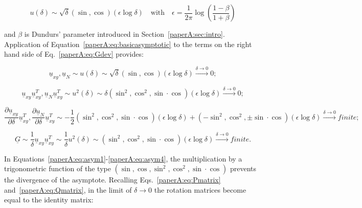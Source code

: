 \begin{equation}\label{paperA:eq:basicasymptotic}
u\left(\delta\right)\sim \sqrt{\delta}\left(\sin,\cos\right)\left(\epsilon\log{\delta}\right)\quad\text{with}\quad\epsilon=\frac{1}{2\pi}\log{\left(\frac{1-\beta}{1+\beta}\right)}
\end{equation}

and $\beta$ is Dundurs' parameter introduced in Section~\ref{paperA:sec:intro}. Application of Equation~\ref{paperA:eq:basicasymptotic} to the terms on the right hand side of Eq.~\ref{paperA:eq:Gdev} provides:

\begin{equation}\label{paperA:eq:asym1}
\underline{u}_{xy},\underline{u}_{N}\sim u\left(\delta\right)\sim\sqrt{\delta}\left(\sin,\cos\right)\left(\epsilon\log{\delta}\right)\xrightarrow{\delta\rightarrow 0}0;
\end{equation}

\begin{equation}\label{paperA:eq:asym2}
\underline{u}_{xy}\underline{u}_{xy}^{T},\underline{u}_{N}\underline{u}_{xy}^{T}\sim u^{2}\left(\delta\right)\sim\delta\left(\sin^{2},\cos^{2},\sin\cdot\cos\right)\left(\epsilon\log{\delta}\right)\xrightarrow{\delta\rightarrow 0}0;
\end{equation}

\begin{equation}\label{paperA:eq:asym3}
\frac{\partial \underline{u}_{xy}}{\partial \delta}\underline{u}_{xy}^{T},\frac{\partial \underline{u}_{N}}{\partial \delta}\underline{u}_{xy}^{T}\sim -\frac{1}{2}\left(\sin^{2},\cos^{2},\sin\cdot\cos\right)\left(\epsilon\log{\delta}\right)+\left(-\sin^{2},\cos^{2},\pm\sin\cdot\cos\right)\left(\epsilon\log{\delta}\right)\xrightarrow{\delta\rightarrow 0}finite;
\end{equation}

\begin{equation}\label{paperA:eq:asym4}
\underline{G}\sim\frac{1}{\delta}\underline{u}_{xy}\underline{u}_{xy}^{T}\sim \frac{1}{\delta}u^{2}\left(\delta\right)\sim\left(\sin^{2},\cos^{2},\sin\cdot\cos\right)\left(\epsilon\log{\delta}\right)\xrightarrow{\delta\rightarrow 0}finite.
\end{equation}

In Equations~\ref{paperA:eq:asym1}-\ref{paperA:eq:asym4}, the multiplication by a trigonometric function of the type $\left(\sin,\cos,\sin^{2},\cos^{2},\sin\cdot\cos\right)$ prevents the divergence of the asymptote. Recalling Eqs.~\ref{paperA:eq:Pmatrix} and~\ref{paperA:eq:Qmatrix}, in the limit of $\delta\rightarrow 0$ the rotation matrices become equal to the identity matrix:

